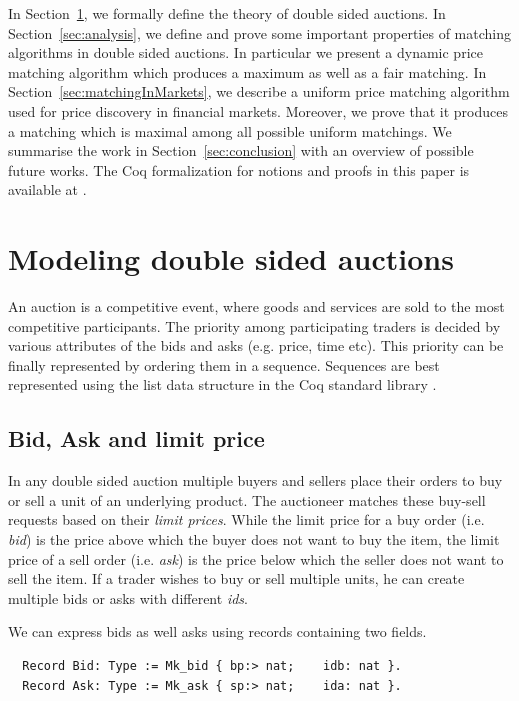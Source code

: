 \documentclass[a4paper,UKenglish,cleveref, autoref]{lipics-v2019}
\begin{document}
In Section~\ref{sec:modeling}, we formally define the theory of double sided auctions. In Section~\ref{sec:analysis}, we define and prove some important properties of matching algorithms in double sided auctions. In particular we present a dynamic price matching algorithm which produces a maximum as well as a fair matching. In Section~\ref{sec:matchingInMarkets}, we describe a uniform price matching algorithm used for price discovery in financial markets. Moreover, we prove that it produces a matching which is maximal among all possible uniform matchings. We summarise the work in Section~\ref{sec:conclusion} with an overview of possible future works. The Coq formalization for notions and proofs in this paper is available at \cite{auctiongithub}.  

\section{Modeling double sided auctions}\label{sec:modeling}
An auction is a  competitive event, where goods and services are sold to the most competitive participants. The priority among participating traders is decided by various attributes of the bids and asks (e.g. price, time etc). This priority can be finally represented by ordering them in a sequence. Sequences are best represented using the list data structure in the Coq standard library \cite{standLib}.

\subsection{Bid, Ask and limit price}
In  any double sided auction multiple buyers and sellers place their orders to buy or sell a unit of an underlying product. The auctioneer matches these buy-sell requests  based on their \emph{limit prices}. While the limit price for a buy order (i.e. \emph{bid}) is the price above which the buyer does not want to buy the item, the limit price of a sell order (i.e. \emph{ask}) is the price below which the seller does not want to sell the item. If a trader wishes to buy or sell multiple units, he can create multiple bids or asks with different \emph{ids}. 

We can express bids as well asks using  records containing two fields. 

\begin{verbatim}
  Record Bid: Type := Mk_bid { bp:> nat;    idb: nat }.
  Record Ask: Type := Mk_ask { sp:> nat;    ida: nat }.
\end{verbatim}
\end{document}
